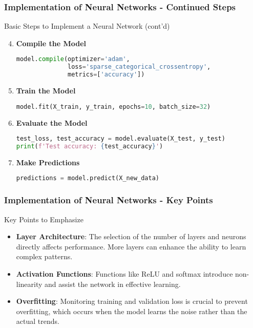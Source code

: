 \documentclass[aspectratio=169]{beamer}
\begin{document}
\begin{frame}[fragile]
    \frametitle{Implementation of Neural Networks - Continued Steps}
    \begin{block}{Basic Steps to Implement a Neural Network (cont'd)}
        \begin{enumerate}
            \setcounter{enumi}{3} %
            \item \textbf{Compile the Model}
            \begin{lstlisting}[language=Python]
model.compile(optimizer='adam', 
              loss='sparse_categorical_crossentropy', 
              metrics=['accuracy'])
            \end{lstlisting}
            
            \item \textbf{Train the Model}
            \begin{lstlisting}[language=Python]
model.fit(X_train, y_train, epochs=10, batch_size=32)
            \end{lstlisting}
            
            \item \textbf{Evaluate the Model}
            \begin{lstlisting}[language=Python]
test_loss, test_accuracy = model.evaluate(X_test, y_test)
print(f'Test accuracy: {test_accuracy}')
            \end{lstlisting}
            
            \item \textbf{Make Predictions}
            \begin{lstlisting}[language=Python]
predictions = model.predict(X_new_data)
            \end{lstlisting}
        \end{enumerate}
    \end{block}
\end{frame}

\begin{frame}[fragile]
    \frametitle{Implementation of Neural Networks - Key Points}
    \begin{block}{Key Points to Emphasize}
        \begin{itemize}
            \item \textbf{Layer Architecture}: The selection of the number of layers and neurons directly affects performance. More layers can enhance the ability to learn complex patterns.
            \item \textbf{Activation Functions}: Functions like ReLU and softmax introduce non-linearity and assist the network in effective learning.
            \item \textbf{Overfitting}: Monitoring training and validation loss is crucial to prevent overfitting, which occurs when the model learns the noise rather than the actual trends.
        \end{itemize}
    \end{block}
\end{frame}
\end{document}
